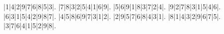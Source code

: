 \begin{sudoku}
|1|4|2|9|7|6|8|5|3|.
|7|8|3|2|5|4|1|6|9|.
|5|6|9|1|8|3|7|2|4|.
|9|2|7|8|3|1|5|4|6|.
|6|3|1|5|4|2|9|8|7|.
|4|5|8|6|9|7|3|1|2|.
|2|9|5|7|6|8|4|3|1|.
|8|1|4|3|2|9|6|7|5|.
|3|7|6|4|1|5|2|9|8|.
\end{sudoku}